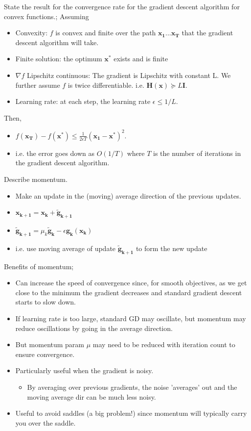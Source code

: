 \documentclass{article}
\begin{document}
State the result for the convergence rate for the gradient descent algorithm for convex functions.; Assuming \begin{itemize}
	\item Convexity: $f$ is convex and finite over the path $\mathbf{x_1...x_T}$ that the gradient descent algorithm will take.
	\item Finite solution: the optimum $\mathbf{x^*}$ exists and is finite
	\item $\nabla f$ Lipschitz continuous: The gradient is Lipschitz with constant L. We further assume $f$ is twice differentiable. i.e. $\mathbf{H(x)}\succeq L\mathbf{I}$.
	\item Learning rate: at each step, the learning rate $\epsilon \leq 1/L$.
\end{itemize}
Then, \begin{itemize}
	\item $f(\mathbf{x_T})-f (\mathbf{x^*})\leq \frac{1}{2\epsilon T}(\mathbf{x_1-x^*})^2$.
	\item i.e. the error goes down as $O(1/T)$ where $T$ is the number of iterations in the gradient descent algorithm.
\end{itemize}

Describe momentum.\begin{itemize}
	\item Make an update in the (moving) average direction of the previous updates.
	\item $\mathbf{x_{k+1}=x_k+\tilde{g}_{k+1}}$
	\item $\mathbf{\tilde{g}_{k+1}}=\mu_k\mathbf{\tilde{g}_k}-\epsilon \mathbf{g_k(x_k)}$
	\item i.e. use moving average of update $\mathbf{\tilde{g}_{k+1}}$ to form the new update
\end{itemize}

Benefits of momentum; \begin{itemize}
	\item Can increase the speed of convergence since, for smooth objectives, as we get close to the minimum the gradient decreases and standard gradient descent starts to slow down.
	\item If learning rate is too large, standard GD may oscillate, but momentum may reduce oscillations by going in the average direction.
	\item But momentum param $\mu$ may need to be reduced with iteration count to ensure convergence.
	\item Particularly useful when the gradient is noisy. 
	\begin{itemize}
		\item By averaging over previous gradients, the noise 'averages' out and the moving average dir can be much less noisy.
	\end{itemize}
\item Useful to avoid saddles (a big problem!) since momentum will typically carry you over the saddle.
\end{itemize}
\end{document}
